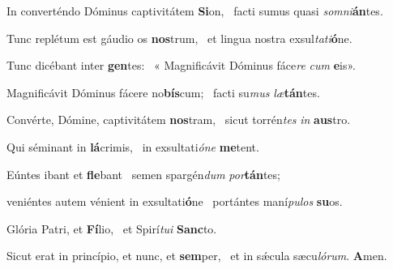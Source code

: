 \item In converténdo Dóminus captivitátem \textbf{Si}on,~\psstar{} facti sumus quasi \textit{somni}\textbf{án}tes.

\item Tunc replétum est gáudio os \textbf{nos}trum,~\psstar{} et lingua nostra exsul\textit{tati}\textbf{ó}ne.

\item Tunc dicébant inter \textbf{gen}tes:~\psstar{} « Magnificávit Dóminus fáce\textit{re} \textit{cum} \textbf{e}is».

\item Magnificávit Dóminus fácere no\textbf{bís}cum;~\psstar{} facti su\textit{mus} \textit{læ}\textbf{tán}tes.

\item Convérte, Dómine, captivitátem \textbf{nos}tram,~\psstar{} sicut torrén\textit{tes} \textit{in} \textbf{aus}tro.

\item Qui séminant in \textbf{lá}crimis,~\psstar{} in exsultati\textit{óne} \textbf{me}tent.

\item Eúntes ibant et \textbf{fle}bant~\psstar{} semen spargén\textit{dum} \textit{por}\textbf{tán}tes;

\item veniéntes autem vénient in exsultati\textbf{ó}ne~\psstar{} portántes maní\textit{pulos} \textbf{su}os.

\item Glória Patri, et \textbf{Fí}lio,~\psstar{} et Spirí\textit{tui} \textbf{Sanc}to.

\item Sicut erat in princípio, et nunc, et \textbf{sem}per,~\psstar{} et in sǽcula sæcu\textit{lórum}. \textbf{A}men.